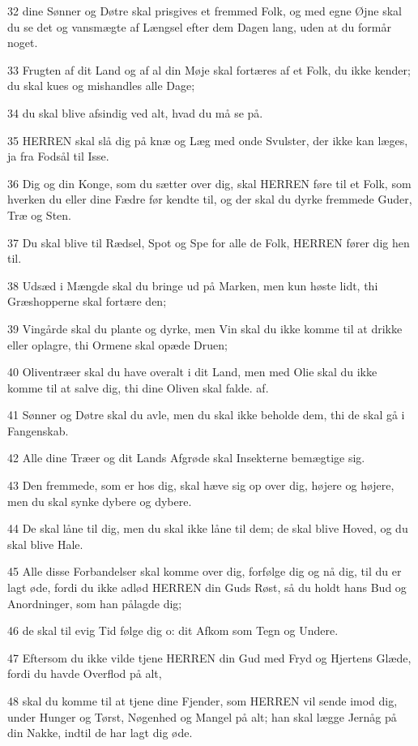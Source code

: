 \par 32 dine Sønner og Døtre skal prisgives et fremmed Folk, og med egne Øjne skal du se det og vansmægte af Længsel efter dem Dagen lang, uden at du formår noget.
\par 33 Frugten af dit Land og af al din Møje skal fortæres af et Folk, du ikke kender; du skal kues og mishandles alle Dage;
\par 34 du skal blive afsindig ved alt, hvad du må se på.
\par 35 HERREN skal slå dig på knæ og Læg med onde Svulster, der ikke kan læges, ja fra Fodsål til Isse.
\par 36 Dig og din Konge, som du sætter over dig, skal HERREN føre til et Folk, som hverken du eller dine Fædre før kendte til, og der skal du dyrke fremmede Guder, Træ og Sten.
\par 37 Du skal blive til Rædsel, Spot og Spe for alle de Folk, HERREN fører dig hen til.
\par 38 Udsæd i Mængde skal du bringe ud på Marken, men kun høste lidt, thi Græshopperne skal fortære den;
\par 39 Vingårde skal du plante og dyrke, men Vin skal du ikke komme til at drikke eller oplagre, thi Ormene skal opæde Druen;
\par 40 Oliventræer skal du have overalt i dit Land, men med Olie skal du ikke komme til at salve dig, thi dine Oliven skal falde. af.
\par 41 Sønner og Døtre skal du avle, men du skal ikke beholde dem, thi de skal gå i Fangenskab.
\par 42 Alle dine Træer og dit Lands Afgrøde skal Insekterne bemægtige sig.
\par 43 Den fremmede, som er hos dig, skal hæve sig op over dig, højere og højere, men du skal synke dybere og dybere.
\par 44 De skal låne til dig, men du skal ikke låne til dem; de skal blive Hoved, og du skal blive Hale.
\par 45 Alle disse Forbandelser skal komme over dig, forfølge dig og nå dig, til du er lagt øde, fordi du ikke adlød HERREN din Guds Røst, så du holdt hans Bud og Anordninger, som han pålagde dig;
\par 46 de skal til evig Tid følge dig o: dit Afkom som Tegn og Undere.
\par 47 Eftersom du ikke vilde tjene HERREN din Gud med Fryd og Hjertens Glæde, fordi du havde Overflod på alt,
\par 48 skal du komme til at tjene dine Fjender, som HERREN vil sende imod dig, under Hunger og Tørst, Nøgenhed og Mangel på alt; han skal lægge Jernåg på din Nakke, indtil de har lagt dig øde.
